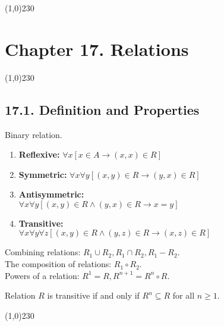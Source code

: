 
\begin{center}
\line(1,0){230}
\end{center}

\section*{Chapter 17. Relations}

\begin{center}
\line(1,0){230}
\end{center}

\subsection*{17.1. Definition and Properties}

Binary relation.

\begin{enumerate}
    \item \textbf{Reflexive: } $\forall x [x \in A \rightarrow (x, x) \in R]$
    \item \textbf{Symmetric: } $\forall x \forall y [(x, y) \in R \rightarrow (y, x) \in R]$
    \item \textbf{Antisymmetric: } \\
    $\forall x \forall y [(x, y) \in R \wedge (y, x) \in R \rightarrow x = y]$
    \item \textbf{Transitive: } \\
    $\forall x \forall y \forall z [(x, y) \in R \wedge (y, z) \in R \rightarrow (x, z) \in R]$
\end{enumerate}
Combining relations: $R_1 \cup R_2, R_1 \cap R_2, R_1 - R_2$. \\
The composition of relations: $R_1 \circ R_2$. \\
Powers of a relation: $R^1 = R, R^{n+1} = R^n \circ R$. \\

\begin{theorem}
    Relation $R$ is transitive if and only if $R^n \subseteq R$ for all $n \geq 1$.
\end{theorem}

\begin{center}
\line(1,0){230}
\end{center}

